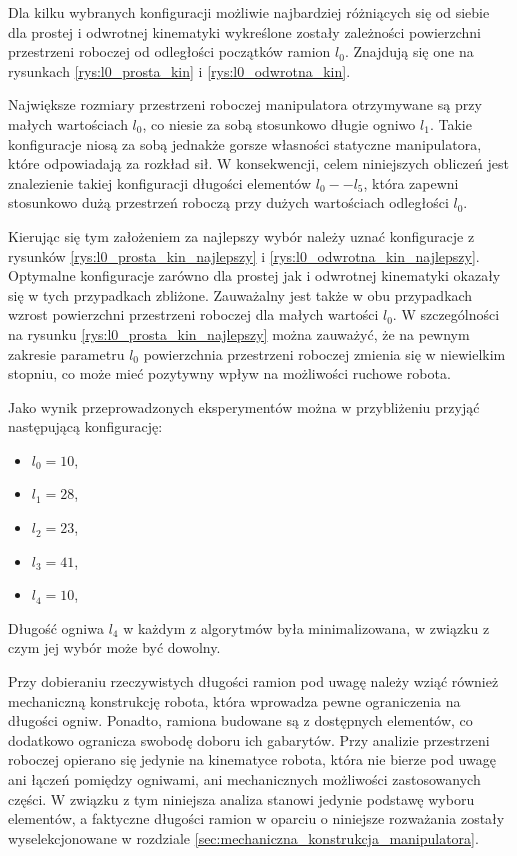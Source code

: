 \documentclass[printmode]{mgr}
\begin{document}
Dla kilku wybranych konfiguracji możliwie najbardziej różniących się od siebie dla prostej i odwrotnej kinematyki
wykreślone zostały zależności powierzchni przestrzeni roboczej od odległości początków ramion $l_0$. Znajdują się one
na rysunkach \ref{rys:l0_prosta_kin} i \ref{rys:l0_odwrotna_kin}.

Największe rozmiary przestrzeni roboczej manipulatora otrzymywane są przy małych wartościach $l_0$, co niesie za sobą stosunkowo
długie ogniwo $l_1$. Takie konfiguracje niosą za sobą jednakże gorsze własności statyczne manipulatora, które
odpowiadają za rozkład sił. W konsekwencji, celem niniejszych obliczeń jest znalezienie takiej konfiguracji długości elementów $l_0 -- l_5$, 
która zapewni stosunkowo dużą przestrzeń roboczą przy dużych wartościach odległości $l_0$. 

Kierując się tym założeniem za najlepszy wybór należy uznać konfiguracje z rysunków \ref{rys:l0_prosta_kin_najlepszy} 
i \ref{rys:l0_odwrotna_kin_najlepszy}. Optymalne konfiguracje zarówno dla prostej jak i odwrotnej kinematyki okazały się w tych przypadkach zbliżone.
Zauważalny jest także w obu przypadkach wzrost powierzchni przestrzeni roboczej dla małych wartości $l_0$. W szczególności na rysunku 
\ref{rys:l0_prosta_kin_najlepszy} można zauważyć, że na pewnym zakresie parametru $l_0$ powierzchnia przestrzeni roboczej zmienia się w 
niewielkim stopniu, co może mieć pozytywny wpływ na możliwości ruchowe robota. 

Jako wynik przeprowadzonych eksperymentów można w przybliżeniu przyjąć następującą konfigurację: 
\begin{itemize}
\item $l_0=10$,
\item $l_1=28$,
\item $l_2=23$,
\item $l_3=41$,
\item $l_4=10$,
\end{itemize}
Długość ogniwa $l_4$ w każdym z algorytmów była minimalizowana, w związku z czym jej wybór może być dowolny.

Przy dobieraniu rzeczywistych długości ramion pod uwagę należy wziąć również mechaniczną konstrukcję robota, która
wprowadza pewne ograniczenia na długości ogniw. Ponadto, ramiona budowane są z dostępnych elementów, co dodatkowo ogranicza swobodę
doboru ich gabarytów. Przy analizie przestrzeni roboczej opierano się jedynie na kinematyce robota, która nie bierze
pod uwagę ani łączeń pomiędzy ogniwami, ani mechanicznych możliwości zastosowanych części. W związku z tym niniejsza analiza stanowi
jedynie podstawę wyboru elementów, a faktyczne długości ramion w oparciu o niniejsze rozważania zostały wyselekcjonowane w rozdziale
\ref{sec:mechaniczna_konstrukcja_manipulatora}.
\end{document}
